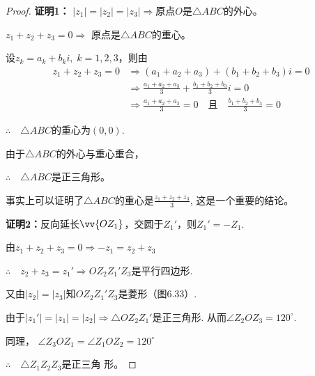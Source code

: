 \begin{proof}
\textbf{证明1：}
$|z_1|=|z_2|=|z_3|\Rightarrow $原点$O$是$\triangle ABC$的外心。

$z_1+z_2+z_3=0\Rightarrow $
原点是$\triangle ABC$的重心。

设$z_k=a_k+b_k i,\; k=1,2,3$，则由
\[\begin{split}
    z_1+z_2+z_3=0 &\Rightarrow (a_1+a_2+a_3)+(b_1+b_2+b_3)i=0\\
    &\Rightarrow \frac{a_1+a_2+a_3}{3}+\frac{b_1+b_2+b_3}{3}i=0\\
    &\Rightarrow \frac{a_1+a_2+a_3}{3}=0\quad \text{且}\quad \frac{b_1+b_2+b_3}{3}=0
\end{split}\]

$\therefore\quad \triangle ABC$的重心为$(0,0)$.

由于$\triangle ABC$的外心与重心重合，

$\therefore\quad \triangle ABC$是正三角形。

\begin{rmk}
    事实上可以证明了$\triangle ABC$的重心是$\frac{z_1+z_2+z_3}{3}$, 
这是一个重要的结论。
\end{rmk}

\noindent
\begin{minipage}{.55\textwidth}\CTEXindent
    \textbf{证明2：}反向延长$\vv{OZ_1}$，交圆于$Z_1'$，则$Z_1'=-Z_1$.

由$z_1+z_2+z_3=0\Rightarrow -z_1=z_2+z_3$

$\therefore\quad z_2+z_3=z_1'\Rightarrow OZ_2Z_1'Z_3$是平行四边形.
    
又由$|z_2|=|z_3|$知$OZ_2Z_1'Z_3$是菱形（图6.33）.

由于$|z_1'|=|z_1|=|z_2|\Rightarrow \triangle OZ_2Z_1'$是正三角形.
从而$\angle Z_2OZ_3=120^{\circ}$. 

同理，
$\angle Z_3 OZ_1=\angle Z_1OZ_2=120^{\circ}$

$\therefore\quad \triangle Z_1Z_2Z_3$是正三角
形。
\end{minipage}
\hfill
\begin{minipage}{.4\textwidth}
\centering
{}
\end{minipage}
\end{proof}

